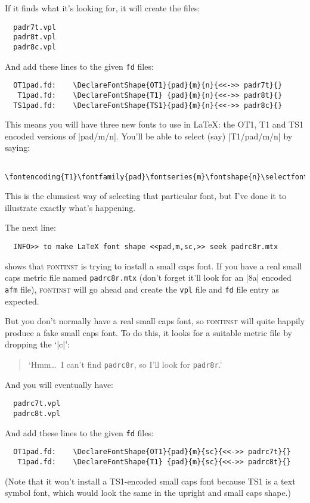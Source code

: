 \documentclass[a4paper]{ltxguide}
\newcommand*{\setfilename}[1]{\texttt{#1}}
\newcommand*{\setpackagename}[1]{\textsc{#1}}
\newcommand{\fontinst}{\setpackagename{font\-inst}\xspace}
\newcommand{\fd} {\setfilename{fd}\xspace}
\newcommand{\afm}{\setfilename{afm}\xspace}
\newcommand{\vpl}{\setfilename{vpl}\xspace}
\begin{document}
If it finds what it's looking for, it will create the files:
\begin{verbatim}
  padr7t.vpl
  padr8t.vpl
  padr8c.vpl
\end{verbatim}
And add these lines to the given \fd files:
\begin{verbatim}
  OT1pad.fd:    \DeclareFontShape{OT1}{pad}{m}{n}{<<->> padr7t}{}
   T1pad.fd:    \DeclareFontShape{T1} {pad}{m}{n}{<<->> padr8t}{}
  TS1pad.fd:    \DeclareFontShape{TS1}{pad}{m}{n}{<<->> padr8c}{}
\end{verbatim}
This means you will have three new fonts to use in \LaTeX: the OT1, T1
and TS1 encoded versions of |pad/m/n|.  You'll be able to select (say)
|T1/pad/m/n| by saying:
\begin{verbatim}
  \fontencoding{T1}\fontfamily{pad}\fontseries{m}\fontshape{n}\selectfont
\end{verbatim}
This is the clumsiest way of selecting that particular font, but I've
done it to illustrate exactly what's happening.

The next line:
\begin{verbatim}
  INFO>> to make LaTeX font shape <<pad,m,sc,>> seek padrc8r.mtx
\end{verbatim}
shows that \fontinst is trying to install a small caps font.  If you
have a real small caps metric file named \texttt{padrc8r.mtx} (don't
forget it'll look for an |8a| encoded \afm file), \fontinst will go
ahead and create the \vpl file and \fd file entry as expected.

But you don't normally have a real small caps font, so \fontinst will
quite happily produce a fake small caps font.  To do this, it looks
for a suitable metric file by dropping the `|c|':
\begin{quote}
  `Hmm\ldots\ I can't find \texttt{padrc8r}, so I'll look for
  \texttt{padr8r}.'
\end{quote}
And you will eventually have:
\begin{verbatim}
  padrc7t.vpl
  padrc8t.vpl
\end{verbatim}
And add these lines to the given \fd files:
\begin{verbatim}
  OT1pad.fd:    \DeclareFontShape{OT1}{pad}{m}{sc}{<<->> padrc7t}{}
   T1pad.fd:    \DeclareFontShape{T1} {pad}{m}{sc}{<<->> padrc8t}{}
\end{verbatim}
(Note that it won't install a TS1-encoded small caps font because
TS1 is a text symbol font, which would look the same in the upright
and small caps shape.)
\end{document}
